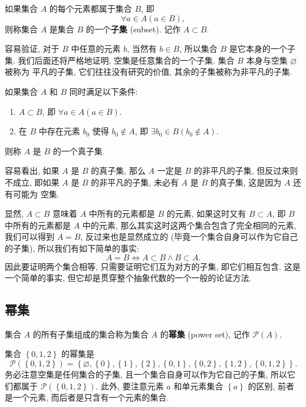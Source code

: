 \documentclass[10pt,UTF8]{book} %
\begin{document}
\begin{definition}[子集]
    如果集合 $A$ 的每个元素都属于集合 $B$, 即
    \[ \forall a \in A \left(
        a \in B
    \right), \]
    则称集合 $A$ 是集合 $B$ 的一个\textbf{子集} (subset). 记作 $A \subset B$.
\end{definition}

容易验证, 对于 $B$ 中任意的元素 $b$, 当然有 $b \in B$, 所以集合 $B$ 是它本身的一个子集.
我们后面还将严格地证明, 空集是任意集合的一个子集. 集合 $B$ 本身与空集 $\varnothing$ 被称为
平凡的子集, 它们往往没有研究的价值, 其余的子集被称为非平凡的子集.

\begin{definition}[真子集]
    如果集合 $A$ 和 $B$ 同时满足以下条件:
    \begin{enumerate}[label={${\arabic*}^\circ$}, itemsep=0pt]
        \item $A \subset B$, 即 $\forall a \in A \left(
            a \in B
        \right)$.
        \item 在 $B$ 中存在元素 $b_0$ 使得 $b_0 \notin A$, 即 $\exists b_0 \in B \left(
            b_0 \notin A
        \right)$.
    \end{enumerate} 
    则称 $A$ 是 $B$ 的一个真子集.
\end{definition}

容易看出, 如果 $A$ 是 $B$ 的真子集, 那么 $A$ 一定是 $B$ 的非平凡的子集, 但反过来则不成立,
即如果 $A$ 是 $B$ 的非平凡的子集, 未必有 $A$ 是 $B$ 的真子集, 这是因为 $A$ 还有可能为
空集.

显然, $A \subset B$ 意味着 $A$ 中所有的元素都是 $B$ 的元素, 如果这时又有 $B \subset A$,
即 $B$ 中所有的元素都是 $A$ 中的元素, 那么其实这时这两个集合包含了完全相同的元素,
我们可以得到 $A=B$, 反过来也是显然成立的 (毕竟一个集合自身可以作为它自己的子集), 
所以我们有如下简单的事实:
\[ A = B \iff A \subset B \wedge B \subset A. \]
因此要证明两个集合相等, 只需要证明它们互为对方的子集, 即它们相互包含. 这是一个简单的事实,
但它却是贯穿整个抽象代数的一个一般的论证方法.

\subsection{幂集}

\begin{definition}[幂集]
    集合 $A$ 的所有子集组成的集合称为集合 $A$ 的\textbf{幂集} (power set),
    记作 $\mathcal{P}(A)$.
\end{definition}
\begin{example}
    集合 $\left\{ 0,1,2 \right\}$ 的幂集是
    \[ \mathcal{P}(\left\{0, 1, 2\right\}) = \left\{
        \varnothing, \left\{ 0 \right\}, \left\{ 1 \right\}, \left\{ 2 \right\},
        \left\{ 0, 1 \right\}, \left\{ 0, 2 \right\}, \left\{
            1,2
        \right\}, \left\{ 0, 1, 2 \right\}
    \right\}. \]
    务必注意空集是任何集合的子集, 且一个集合自身可以作为它自己的子集, 所以它们都属于 
    $\mathcal{P}(\left\{
        0, 1, 2
    \right\})$. 此外, 要注意元素 $a$ 和单元素集合 $\left\{ a \right\}$ 的区别,
    前者是一个元素, 而后者是只含有一个元素的集合.
\end{example}
\end{document}
